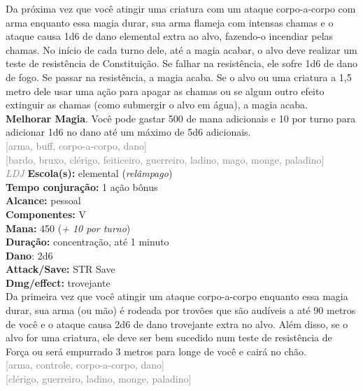 \documentclass{RPG_Adventure}[2021/10/20]
\begin{document}
{\normalsize Da próxima vez que você atingir uma criatura com um ataque corpo-a-corpo com arma enquanto essa magia durar, sua arma flameja com intensas chamas e o ataque causa 1d6 de dano elemental extra ao alvo, fazendo-o incendiar pelas chamas. No início de cada turno dele, até a magia acabar, o alvo deve realizar um teste de resistência de Constituição. Se falhar na resistência, ele sofre 1d6 de dano de fogo. Se passar na resistência, a magia acaba. Se o alvo ou uma criatura a 1,5 metro dele usar uma ação para apagar as chamas ou se algum outro efeito extinguir as chamas (como submergir o alvo em água), a magia acaba.\\\t \textbf{Melhorar Magia}. Você pode gastar 500 de mana adicionais e 10 por turno para adicionar 1d6 no dano até um máximo de 5d6 adicionais.\\}
{\scriptsize \textcolor{gray}{[arma, buff, corpo-a-corpo, dano]\\}}
{\scriptsize \textcolor{gray}{[bardo, bruxo, clérigo, feiticeiro, guerreiro, ladino, mago, monge, paladino]\\}}
{\tiny \textcolor{gray}{\textit{LDJ}}}
{\small \t \textbf{Escola(s):} elemental (\textit{relâmpago})\\\t \textbf{Tempo conjuração:} 1 ação bônus\\\t \textbf{Alcance:} pessoal\\\t \textbf{Componentes:} V\\\t \textbf{Mana:} 450 (\textit{+ 10 por turno})\\\t \textbf{Duração:} concentração, até 1 minuto\\\t \textbf{Dano}: 2d6\\\t \textbf{Attack/Save:} STR Save\\\t \textbf{Dmg/effect:} trovejante\\}
{\normalsize Da primeira vez que você atingir um ataque corpo-a-corpo enquanto essa magia durar, sua arma (ou mão) é rodeada por trovões que são audíveis a até 90 metros de você e o ataque causa 2d6 de dano trovejante extra no alvo. Além disso, se o alvo for uma criatura, ele deve ser bem sucedido num teste de resistência de Força ou será empurrado 3 metros para longe de você e cairá no chão.\\}
{\scriptsize \textcolor{gray}{[arma, controle, corpo-a-corpo, dano]\\}}
{\scriptsize \textcolor{gray}{[clérigo, guerreiro, ladino, monge, paladino]\\}}
\end{document}
